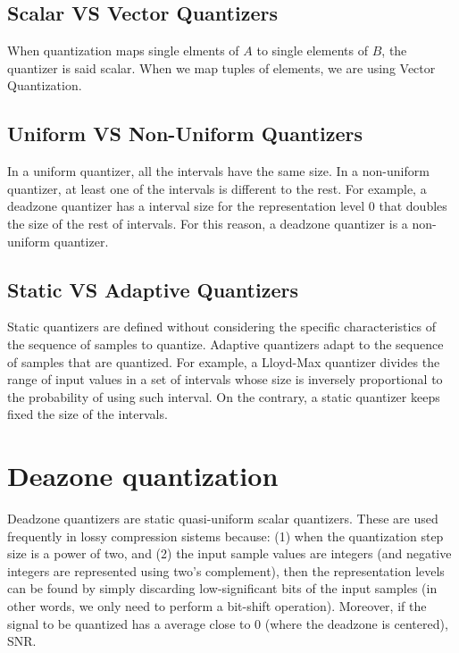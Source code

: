 \subsection{Scalar VS Vector Quantizers}

When quantization maps single elments of $A$ to single elements of
$B$, the quantizer is said scalar. When we map tuples of elements, we
are using Vector Quantization.

\subsection{Uniform VS Non-Uniform Quantizers}

In a uniform quantizer, all the intervals have the same size. In a
non-uniform quantizer, at least one of the intervals is different to
the rest. For example, a deadzone quantizer has a interval size for
the representation level 0 that doubles the size of the rest of
intervals. For this reason, a deadzone quantizer is a non-uniform
quantizer.

\subsection{Static VS Adaptive Quantizers}

Static quantizers are defined without considering the specific
characteristics of the sequence of samples to quantize. Adaptive
quantizers adapt to the sequence of samples that are quantized. For
example, a Lloyd-Max quantizer divides the range of input values in a
set of intervals whose size is inversely proportional to the
probability of using such interval. On the contrary, a static
quantizer keeps fixed the size of the intervals.

\section{Deazone quantization}

Deadzone quantizers are static quasi-uniform scalar quantizers. These
are used frequently in lossy compression sistems because: (1) when the
quantization step size is a power of two, and (2) the input sample
values are integers (and negative integers are represented using two's
complement), then the representation levels can be found by simply
discarding low-significant bits of the input samples (in other words,
we only need to perform a bit-shift operation). Moreover, if the signal to be quantized has a average close to 0 (where the deadzone is centered), SNR.

